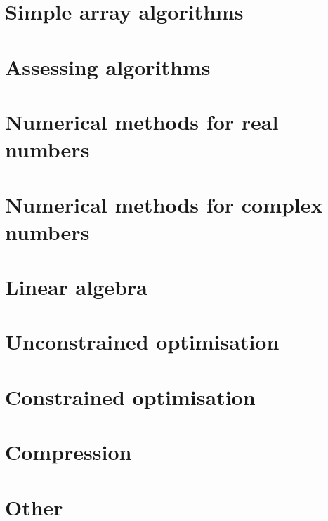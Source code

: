 \documentclass[oneside]{book}
\begin{document}
\part{Simple array algorithms}






\part{Assessing algorithms}



\part{Numerical methods for real numbers}







\part{Numerical methods for complex numbers}


\part{Linear algebra}









\part{Unconstrained optimisation}





\part{Constrained optimisation}


\part{Compression}


\part{Other}


\end{document}
